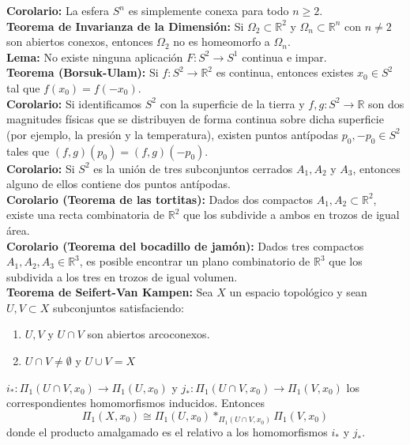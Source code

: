 \documentclass{article}
\begin{document}
\textbf{Corolario:} La esfera $S^n$ es simplemente conexa para todo $n\geq 2$. \\

\textbf{Teorema de Invarianza de la Dimensión:} Si $\Omega_2\subset \mathbb{R}^2$ y $\Omega_n\subset \mathbb{R}^n$ con $n\neq 2$ son abiertos conexos, entonces $\Omega_2$ no es homeomorfo a $\Omega_n$.\\

\textbf{Lema:} No existe ninguna aplicación $F:S^2\rightarrow S^1$ continua e impar. \\

\textbf{Teorema (Borsuk-Ulam):} Si $f:S^2\rightarrow \mathbb{R}^2$ es continua, entonces existes $x_0\in S^2$ tal que $f(x_0)=f(-x_0)$. \\

\textbf{Corolario:} Si identificamos $S^2$ con la superficie de la tierra y $f,g:S^2\rightarrow \mathbb{R}$ son dos magnitudes físicas que se distribuyen de forma continua sobre dicha superficie (por ejemplo, la presión y la temperatura), existen puntos antípodas $p_0,-p_0\in S^2$ tales que $(f,g)(p_0)=(f,g)(-p_0)$.\\

\textbf{Corolario:} Si $S^2$ es la unión de tres subconjuntos cerrados $A_1,A_2$ y $A_3$, entonces alguno de ellos contiene dos puntos antípodas.\\

\textbf{Corolario (Teorema de las tortitas):} Dados dos compactos $A_1,A_2\subset \mathbb{R}^2$, existe una recta combinatoria de $\mathbb{R}^2$ que los subdivide a ambos en trozos de igual área. \\

\textbf{Corolario (Teorema del bocadillo de jamón):} Dados tres compactos $A_1,A_2,A_3\in \mathbb{R}^3$, es posible encontrar un plano combinatorio de $\mathbb{R}^3$ que los subdivida a los tres en trozos de igual volumen. \\

\textbf{Teorema de Seifert-Van Kampen:} Sea $X$ un espacio topológico y sean $U,V\subset X$ subconjuntos satisfaciendo:
\begin{enumerate}
\item $U,V$ y $U\cap V$ son abiertos arcoconexos.

\item $U\cap V\neq \emptyset$ y $U\cup V=X$
\end{enumerate}

$i_*:\Pi_1(U\cap V,x_0)\rightarrow \Pi_1(U,x_0)$ y $j_*:\Pi_1(U\cap V,x_0)\rightarrow \Pi_1(V,x_0)$ los correspondientes homomorfismos inducidos. Entonces
\begin{equation*}
\Pi_1(X,x_0)\cong \Pi_1(U,x_0)*_{\Pi_1(U\cap V,x_0)}\Pi_1(V,x_0)
\end{equation*}
donde el producto amalgamado es el relativo a los homomorfismos $i_*$ y $j_*$.\\
\end{document}
